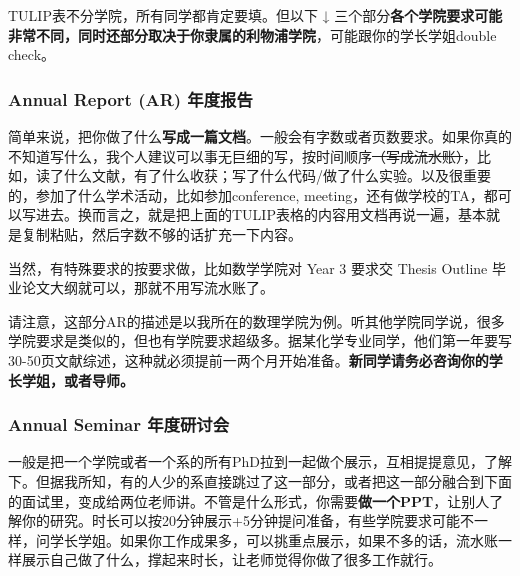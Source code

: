 TULIP表不分学院，所有同学都肯定要填。但以下 ↓ 三个部分\textbf{各个学院要求可能非常不同，同时还部分取决于你隶属的利物浦学院}，可能跟你的学长学姐double check。

\subsubsection{Annual Report (AR) 年度报告}
简单来说，把你做了什么\textbf{写成一篇文档}。一般会有字数或者页数要求。如果你真的不知道写什么，我个人建议可以事无巨细的写，按时间顺序\sout{（写成流水账）}，比如，读了什么文献，有了什么收获；写了什么代码/做了什么实验。以及很重要的，参加了什么学术活动，比如参加conference, meeting，还有做学校的TA，都可以写进去。换而言之，就是把上面的TULIP表格的内容用文档再说一遍，基本就是复制粘贴，然后字数不够的话扩充一下内容。

当然，有特殊要求的按要求做，比如数学学院对 Year 3 要求交 Thesis Outline 毕业论文大纲就可以，那就不用写流水账了。

请注意，这部分AR的描述是以我所在的数理学院为例。听其他学院同学说，很多学院要求是类似的，但也有学院要求超级多。据某化学专业同学，他们第一年要写30-50页文献综述，这种就必须提前一两个月开始准备。\textbf{新同学请务必咨询你的学长学姐，或者导师。}

\subsubsection{Annual Seminar 年度研讨会}
一般是把一个学院或者一个系的所有PhD拉到一起做个展示，互相提提意见，了解下。但据我所知，有的人少的系直接跳过了这一部分，或者把这一部分融合到下面的面试里，变成给两位老师讲。不管是什么形式，你需要\textbf{做一个PPT}，让别人了解你的研究。时长可以按20分钟展示+5分钟提问准备，有些学院要求可能不一样，问学长学姐。如果你工作成果多，可以挑重点展示，如果不多的话，流水账一样展示自己做了什么，撑起来时长，让老师觉得你做了很多工作就行。

